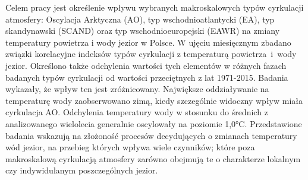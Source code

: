 \documentclass[\main/boa.tex]{subfiles}
\begin{document}
Celem pracy jest określenie wpływu wybranych makroskalowych typów cyrkulacji atmosfery: Oscylacja Arktyczna (AO), typ wschodnioatlantycki (EA), typ skandynawski (SCAND) oraz typ wschodnioeuropejski (EAWR) na zmiany temperatury powietrza i wody jezior w Polsce. W ujęciu miesięcznym zbadano związki korelacyjne indeksów typów cyrkulacji z temperaturą powietrza~i~wody jezior. Określono także odchylenia wartości tych elementów w różnych fazach badanych typów cyrkulacji od wartości przeciętnych z lat 1971-2015. Badania wykazały, że wpływ ten jest zróżnicowany. Największe oddziaływanie na temperaturę wody zaobserwowano zimą, kiedy szczególnie widoczny wpływ miała cyrkulacja AO. Odchylenia temperatury wody w stosunku  do średnich z analizowanego wielolecia generalnie oscylowały na poziomie 1,0°C. Przedstawione badania wskazują na złożoność procesów decydujących o zmianach temperatury wód  jezior, na przebieg których wpływa wiele czynników; które poza makroskalową cyrkulacją atmosfery zarówno obejmują te o  charakterze lokalnym czy indywidulanym poszczególnych jezior. 
\end{document}
